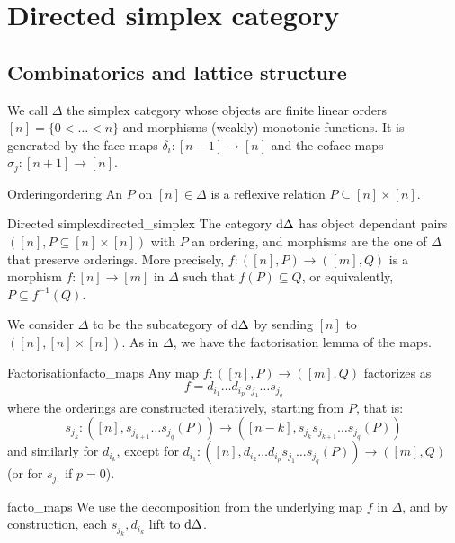 \section{Directed simplex category}

\subsection{Combinatorics and lattice structure}

We call \( \Delta \) the simplex category whose objects are finite linear orders \( [n] = \{0 < \dots < n\} \) and morphisms (weakly) monotonic functions. It is generated by the face maps \( \delta_i : [n-1] \to [n] \) and the coface maps \( \sigma_j : [n+1] \to [n] \).

\begin{cdef}{Ordering}{ordering}
    An  \( P \) on \( [n] \in \Delta \) is a reflexive relation \( P \subseteq [n] \times [n]  \).
\end{cdef}

\begin{cdef}{Directed simplex}{directed_simplex}
    The  category \( \mathrm{d}\Delta \) has object dependant pairs \( ([n], P \subseteq [n] \times [n]) \) with \( P \) an ordering, and morphisms are the one of \( \Delta \) that preserve orderings. More precisely, \( f : ([n], P) \to ([m], Q) \) is a morphism \( f : [n] \to [m] \) in \( \Delta \) such that \( f(P) \subseteq Q \), or equivalently, \( P \subseteq f^{-1}(Q) \).
\end{cdef}

We consider \( \Delta \) to be the subcategory of \( \mathrm{d}\Delta \) by sending \( [n] \) to \( ([n], [n] \times [n]) \). As in \( \Delta \), we have the factorisation lemma of the maps.
\begin{clem}{Factorisation}{facto_maps}
    Any map \( f : ([n], P) \to ([m], Q) \) factorizes as 
    \begin{equation*}
        f = d_{i_1}\dots d_{i_p}s_{j_1}\dots s_{j_q}
    \end{equation*}
    where the orderings are constructed iteratively, starting from \( P \), that is:
    \begin{equation*}
        s_{j_k} : ([n], s_{j_{k+1}}\dots s_{j_q}(P)) \to ([n - k], s_{j_k}s_{j_{k+1}}\dots s_{j_q}(P)) 
    \end{equation*}
    and similarly for \( d_{i_k} \), except for \( d_{i_1} : ([n], d_{i_2}\dots d_{i_p}s_{j_1}\dots s_{j_q}(P)) \to ([m], Q) \) (or for \( s_{j_1} \) if \( p = 0 \)).
\end{clem} 
\begin{lemproof}{facto_maps}
    We use the decomposition from the underlying map \( f \) in \( \Delta \), and by construction, each \( s_{j_k}, d_{i_k} \) lift to \( \mathrm{d}\Delta \).
\end{lemproof}

